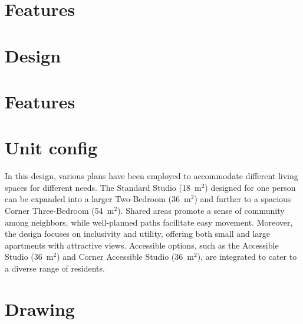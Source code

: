 \section*{%
  Features
 }
\begin{center}
	\begin{minipage}{0.8\linewidth}
		
	\end{minipage}
\end{center}
\section*{%
  Design
 }

\EndTwoColumnLayout
\begin{minipage}[t]{0.3\linewidth}
	\section*{%
	  Features
	 }
\end{minipage}%
\hfill
\begin{minipage}[t]{0.7\linewidth}
	\section*{%
	  Unit config
	 }
	
	\vspace{0.5cm}%
	\small
	\setlength{\columnsep}{0.75cm}
	\begin{multicols}{3}
		In this design, various plans have been employed to accommodate different living spaces for different needs. The Standard Studio (18~$\text{m}^2$) designed for one person can be expanded into a larger Two-Bedroom (36~$\text{m}^2$) and further to a spacious Corner Three-Bedroom (54~$\text{m}^2$). Shared areas promote a sense of community among neighbors, while well-planned paths facilitate easy movement.
		\newline%
		Moreover, the design focuses on inclusivity and utility, offering both small and large apartments with attractive views. Accessible options, such as the Accessible Studio (36~$\text{m}^2$) and Corner Accessible Studio (36~$\text{m}^2$), are integrated to cater to a diverse range of residents.
	\end{multicols}
	\section*{%
	  Drawing
	 }
	
\end{minipage}
\newpage
